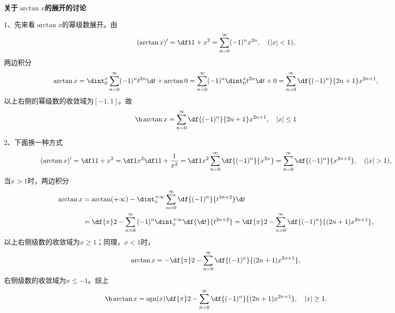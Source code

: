 \begin{shaded}
	{\bf 关于$\arctan x$的展开的讨论}

	1、先来看$\arctan x$的幂级数展开。由
	$$(\arctan x)'=\df1{1+x^2}
	=\sum\limits_{n=0}^{\infty}(-1)^nx^{2n}, \quad (|x|<1),$$
	两边积分
	$$\arctan x=\dint_0^x\sum\limits_{n=0}^{\infty}(-1)^nt^{2n}\d t
	+\arctan 0
	=\sum\limits_{n=0}^{\infty}(-1)^n\dint_0^xt^{2n}\d t+0
	=\sum\limits_{n=0}^{\infty}\df{(-1)^n}{2n+1}x^{2n+1},$$
	以上右侧的幂级数的收敛域为$[-1,1]$。故
	$${\b\arctan x=\sum\limits_{n=0}^{\infty}\df{(-1)^n}{2n+1}x^{2n+1},
	\quad |x|\leq1}$$

	\begin{center}
	\end{center}

	2、下面换一种方式
	$$(\arctan x)'=\df1{1+x^2}=\df1{x^2}\df1{1+\frac1{x^2}}
	=\df1{x^2}\sum\limits_{n=0}^{\infty}\df{(-1)^n}{x^{2n}}
	=\sum\limits_{n=0}^{\infty}\df{(-1)^n}{x^{2n+2}}, \quad (|x|>1),$$
	当$x>1$时，两边积分
	\begin{align*}
	\arctan x&=\arctan(+\infty)-
	\dint_x^{+\infty}\sum\limits_{n=0}^{\infty}\df{(-1)^n}{t^{2n+2}}\d t\\
	&=\df{\pi}2-\sum\limits_{n=0}^{\infty}{(-1)^n}\dint_x^{+\infty}\df{\d
	t}{t^{2n+2}} =\df{\pi}2-\sum\limits_{n=0}^{\infty}\df{(-1)^{n}}{(2n+1)x^{2n+1}},
	\end{align*}
	以上右侧级数的收敛域为$x\geq 1$；同理，$x<1$时，
	$$\arctan x=-\df{\pi}2
	-\sum\limits_{n=0}^{\infty}\df{(-1)^{n}}{(2n+1)x^{2n+1}},$$
	右侧级数的收敛域为$x\leq -1$。综上
	$${\b\arctan x=\mathrm{sgn}(x)\df{\pi}2-\sum\limits_{n=0}^{\infty}
	\df{(-1)^{n}}{(2n+1)x^{2n+1}},\quad |x|\geq1.}$$


\end{shaded}
